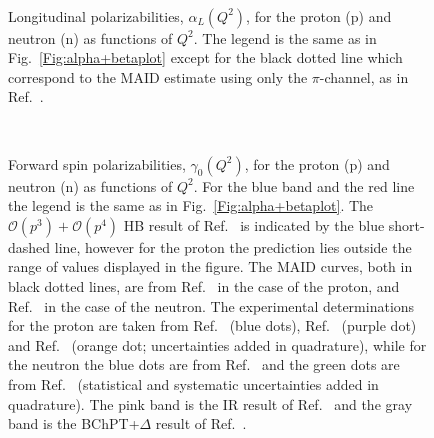 \documentclass[twocolumn,prc,showpacs,nofootinbib,preprintnumbers,amsmath,amssymb,superscriptaddress]{revtex4-1}
\begin{document}
\begin{figure}[H]
\begin{center}
\hspace{-0.3cm}\\[0.5cm]
\caption{Longitudinal polarizabilities, $\alpha_L (Q^2)$, for the proton  (p) and neutron (n) as functions of $Q^2$. The legend is the same as in Fig.~\ref{Fig:alpha+betaplot} except for the black dotted line which correspond to the MAID estimate using only the $\pi$-channel, as in Ref.~\cite{Drechsel:2002ar}.  \label{Fig:alphaLplot}}
\end{center}
\end{figure}

\begin{figure}[H]
\begin{center}
\hspace{-0.3cm}\\[0.5cm]
 \hspace{-0.3cm}
\caption{Forward spin polarizabilities, $\gamma_0(Q^2)$, for the proton (p) and neutron (n) as functions of $Q^2$. 
For the blue band and the red line the legend is the same as in Fig.~\ref{Fig:alpha+betaplot}. The $\mathcal{O}(p^3)+\mathcal{O}(p^4)$ HB result of Ref.~\cite{Kao:2002cp} is indicated by the blue short-dashed line, however for the proton the prediction lies outside the range of values displayed in the figure. 
The MAID curves, both in black dotted lines, are from Ref.~\cite{Drechsel:2002ar} in the case of the proton, and Ref.~\cite{Amarian:2004yf} in the case of the neutron. 
The experimental determinations for the proton are taken from Ref.~\cite{Prok:2008ev} (blue dots), Ref.~\cite{Dutz:2003mm} (purple dot) and Ref.~\cite{Zielinski:2017gwp} (orange dot; uncertainties added in quadrature), while for the neutron the blue dots are from Ref.~\cite{Amarian:2004yf} and the green dots are from Ref.~\cite{Guler:2015} (statistical and systematic uncertainties added in quadrature). The pink band is the IR result of Ref.~\cite{Bernard:2002pw} and the gray band is the BChPT+$\Delta$ result of Ref.~\cite{Bernard:2012hb}. \label{Fig:gamma0plot}}
\end{center}
\end{figure}
\end{document}
